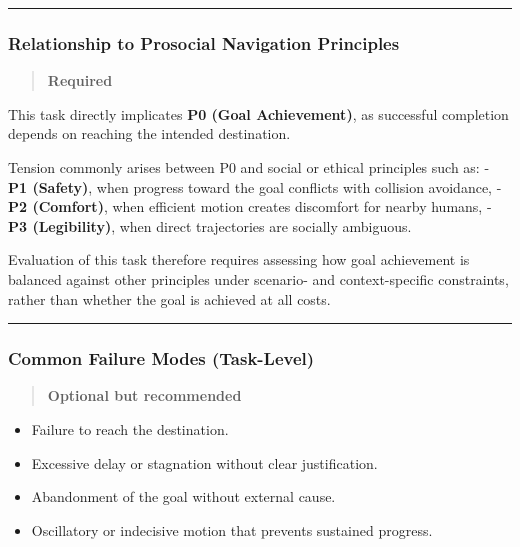 \documentclass[utf8]{frontiers_suppmat} %
\providecommand{\tightlist}{%
  \setlength{\itemsep}{0pt}\setlength{\parskip}{0pt}}
\begin{document}
\begin{center}\rule{0.5\linewidth}{0.5pt}\end{center}

\subsubsection{Relationship to Prosocial Navigation
Principles}\label{relationship-to-prosocial-navigation-principles}

\begin{quote}
\textbf{Required}
\end{quote}

This task directly implicates \textbf{P0 (Goal Achievement)}, as
successful completion depends on reaching the intended destination.

Tension commonly arises between P0 and social or ethical principles such
as: - \textbf{P1 (Safety)}, when progress toward the goal conflicts with
collision avoidance, - \textbf{P2 (Comfort)}, when efficient motion
creates discomfort for nearby humans, - \textbf{P3 (Legibility)}, when
direct trajectories are socially ambiguous.

Evaluation of this task therefore requires assessing how goal
achievement is balanced against other principles under scenario- and
context-specific constraints, rather than whether the goal is achieved
at all costs.

\begin{center}\rule{0.5\linewidth}{0.5pt}\end{center}

\subsubsection{Common Failure Modes
(Task-Level)}\label{common-failure-modes-task-level}

\begin{quote}
\textbf{Optional but recommended}
\end{quote}

\begin{itemize}
\tightlist
\item
  Failure to reach the destination.
\item
  Excessive delay or stagnation without clear justification.
\item
  Abandonment of the goal without external cause.
\item
  Oscillatory or indecisive motion that prevents sustained progress.
\end{itemize}
\end{document}
